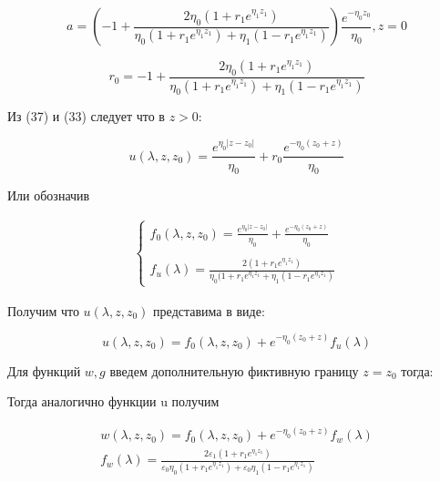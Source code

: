 	\begin{equation}
		a= (-1 + \frac{2 \eta_0(1+r_1e^{\eta_1z_1})}{\eta_0(1+r_1e^{\eta_1 z_1}) + \eta_1(1 - r_1e^{\eta_1 z_1})})\frac{e^{-\eta_0z_0}}{\eta_0}, z = 0 
	\end{equation}
	
	
	\begin{equation}
		r_0 = -1 + \frac{2 \eta_0(1+r_1e^{\eta_1z_1})}{\eta_0(1+r_1e^{\eta_1 z_1}) + \eta_1(1 - r_1e^{\eta_1 z_1})}\tag{37.1}
	\end{equation}
	
	Из (37)  и (33) следует что в $z>0$:
	
	\begin{equation}
		u(\lambda, z, z_0)  = \frac{e^{\eta_0|z-z_0|}}{\eta_0} + r_0 \frac{e^{-\eta_0(z_0+z)}}{\eta_0} 
	\end{equation}
	
	Или обозначив
	
	\begin{equation}
		\begin{aligned}
			\begin{cases} f_0(\lambda, z, z_0) = \frac{e^{\eta_0|z-z_0|}}{\eta_0} + \frac{e^{-\eta_0(z_0+z)}}{\eta_0} \\  \\ f_u(\lambda) = \frac{2 (1+r_1e^{\eta_1z_1})}{\eta_0(1+r_1e^{\eta_1 z_1} + \eta_1(1 - r_1e^{\eta_1 z_1})} \end{cases} 
		\end{aligned}
	\end{equation}
	
	Получим что $u(\lambda, z, z_0)$  представима в виде:
	
	\begin{equation}
		u(\lambda, z, z_0) = f_0(\lambda, z, z_0) + e^{-\eta_0(z_0 + z)}f_u(\lambda) 
	\end{equation}
	
	Для функций $w, g $ введем дополнительную фиктивную границу $z = z_0$ тогда:
	
	
	Тогда аналогично функции u получим
	
	\begin{equation}
		\begin{aligned}
			w(\lambda, z, z_0) = f_0(\lambda, z, z_0) + e^{-\eta_0(z_0 + z)}f_w(\lambda) \\ f_w(\lambda) = \frac{2 \varepsilon_1(1+r_1e^{\eta_1z_1})}{\varepsilon_0 \eta_0(1+r_1e^{\eta_1 z_1}) + \varepsilon_0\eta_1(1 - r_1e^{\eta_1 z_1})}  
		\end{aligned}
	\end{equation}
	
